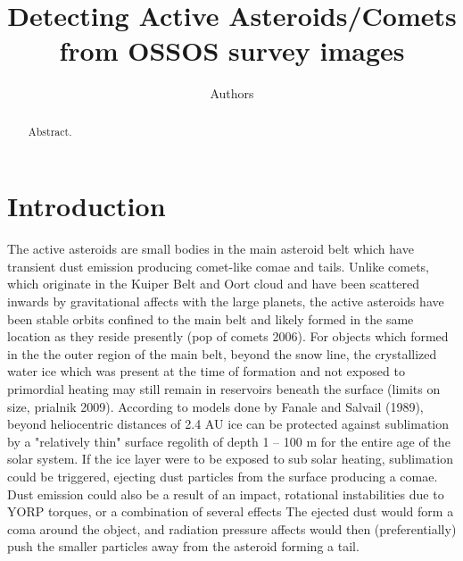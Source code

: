 \documentclass[iop,apj]{emulateapj}
\begin{document}
\title{Detecting Active Asteroids/Comets from OSSOS survey images}
\author{Authors}

\begin{abstract}
Abstract.
\end{abstract}

\maketitle

\section{Introduction}

The active asteroids are small bodies in the main asteroid belt which have transient dust emission producing comet-like comae and tails. Unlike comets, which originate in the Kuiper Belt and Oort cloud and have been scattered inwards by gravitational affects with the large planets, the active asteroids have been stable orbits confined to the main belt and likely formed in the same location as they reside presently \cite{TEST}(pop of comets 2006). For objects which formed in the the outer region of the main belt, beyond the snow line, the crystallized water ice which was present at the time of formation and not exposed to primordial heating may still remain in reservoirs beneath the surface \cite{TEST}(limits on size, prialnik 2009).  According to models done by \citet{fanale89} Fanale and Salvail (1989),  beyond heliocentric distances of 2.4 AU ice can be protected against sublimation by a "relatively thin" surface regolith  of depth 1 -- 100 m for the entire age of the solar system. If the ice layer were to be exposed to sub solar heating,  sublimation could be triggered,  ejecting dust particles from the surface producing a comae.  %
Dust emission could also be a result of an impact, rotational instabilities due to YORP torques, or a combination of several effects \cite{hiesh2015}%
The ejected dust would form a coma around the object, and radiation pressure affects would then (preferentially) push the smaller particles away from the asteroid forming a tail.

\end{document}
